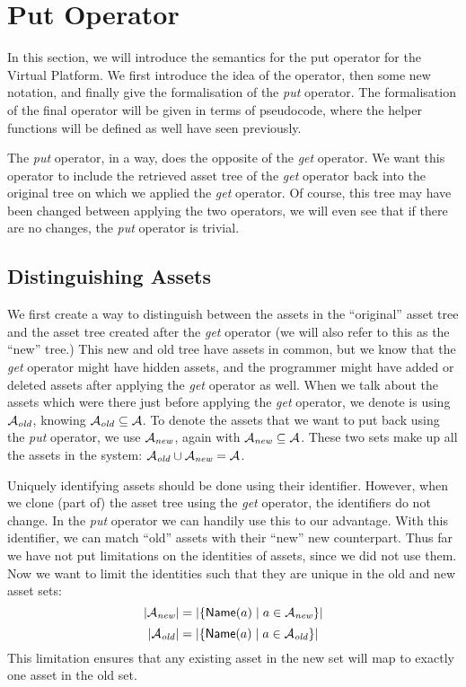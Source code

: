 \section{Put Operator}\label{sec:vp:putoperator}
In this section, we will introduce the semantics for the put operator for the
Virtual Platform. We first introduce the idea of the operator, then some new 
notation, and finally give the formalisation of the \emph{put} operator.
The formalisation of the final operator will be given in terms of pseudocode,
where the helper functions will be defined as well have seen previously.

The \emph{put} operator, in a way, does the opposite of the \emph{get} 
operator. We want this operator to include the retrieved asset tree of the
\emph{get} operator back into the original tree on which we applied the
\emph{get} operator. Of course, this tree may have been changed between applying
the two operators, we will even see that if there are no changes, the
\emph{put} operator is trivial.

\subsection{Distinguishing Assets}
We first create a way to distinguish between the assets in the ``original''
asset tree and the asset tree created after the \emph{get} operator (we will
also refer to this as the ``new'' tree.) This new and old tree have assets in
common, but we know that the \emph{get} operator might have hidden assets, and
the programmer might have added or deleted assets after applying the \emph{get}
operator as well. When we talk about the assets which were there just before
applying the \emph{get} operator, we denote is using \(\mathcal{A}_{\it old}\), knowing
\(\mathcal{A}_{\it old} \subseteq \mathcal{A}\). To denote the assets that we want to put
back using the \emph{put} operator, we use \(\mathcal{A}_{\it new}\), again with
\(\mathcal{A}_{\it new} \subseteq \mathcal{A}\). These two sets make up all the assets in
the system: \(\mathcal{A}_{\it old} \cup \mathcal{A}_{\it new} = \mathcal{A}\).

Uniquely identifying assets should be done using their identifier. However,
when we clone (part of) the asset tree using the \emph{get} operator, the
identifiers do not change. In the \emph{put} operator we can handily use this
to our advantage. With this identifier, we can match ``old'' assets with their
``new'' new counterpart. Thus far we have not put limitations on the identities
of assets, since we did not use them. Now we want to limit the identities such
that they are unique in the old and new asset sets:
\[
  \left| \mathcal{A}_{\it new} \right| = \left| \left\{ {\sf Name}(a) \hspace*{1mm}\middle|\hspace*{1mm} a \in \mathcal{A}_{\it new} \right\} \right|
\]
\[
  \left| \mathcal{A}_{\it old} \right| = \left| \left\{ {\sf Name}(a) \hspace*{1mm}\middle|\hspace*{1mm} a \in \mathcal{A}_{\it old} \right\} \right|
\]
This limitation ensures that any existing asset in the new set will map to
exactly one asset in the old set.

